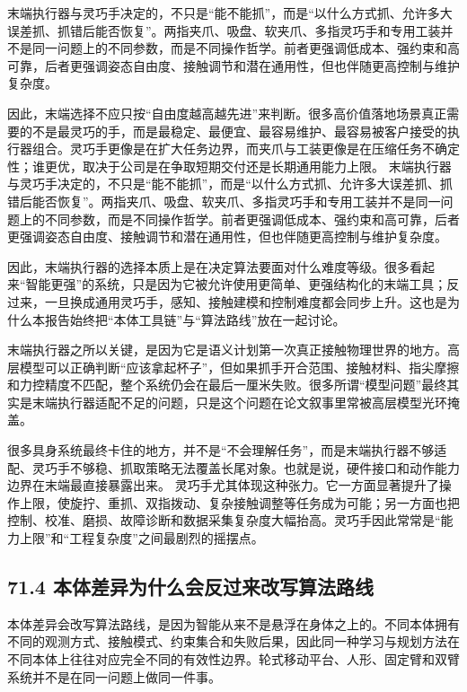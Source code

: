 末端执行器与灵巧手决定的，不只是“能不能抓”，而是“以什么方式抓、允许多大误差抓、抓错后能否恢复”。两指夹爪、吸盘、软夹爪、多指灵巧手和专用工装并不是同一问题上的不同参数，而是不同操作哲学。前者更强调低成本、强约束和高可靠，后者更强调姿态自由度、接触调节和潜在通用性，但也伴随更高控制与维护复杂度。

因此，末端选择不应只按“自由度越高越先进”来判断。很多高价值落地场景真正需要的不是最灵巧的手，而是最稳定、最便宜、最容易维护、最容易被客户接受的执行器组合。灵巧手更像是在扩大任务边界，而夹爪与工装更像是在压缩任务不确定性；谁更优，取决于公司是在争取短期交付还是长期通用能力上限。 末端执行器与灵巧手决定的，不只是“能不能抓”，而是“以什么方式抓、允许多大误差抓、抓错后能否恢复”。两指夹爪、吸盘、软夹爪、多指灵巧手和专用工装并不是同一问题上的不同参数，而是不同操作哲学。前者更强调低成本、强约束和高可靠，后者更强调姿态自由度、接触调节和潜在通用性，但也伴随更高控制与维护复杂度。

因此，末端执行器的选择本质上是在决定算法要面对什么难度等级。很多看起来“智能更强”的系统，只是因为它被允许使用更简单、更强结构化的末端工具；反过来，一旦换成通用灵巧手，感知、接触建模和控制难度都会同步上升。这也是为什么本报告始终把“本体工具链”与“算法路线”放在一起讨论。

末端执行器之所以关键，是因为它是语义计划第一次真正接触物理世界的地方。高层模型可以正确判断“应该拿起杯子”，但如果抓手开合范围、接触材料、指尖摩擦和力控精度不匹配，整个系统仍会在最后一厘米失败。很多所谓“模型问题”最终其实是末端执行器适配不足的问题，只是这个问题在论文叙事里常被高层模型光环掩盖。

很多具身系统最终卡住的地方，并不是“不会理解任务”，而是末端执行器不够适配、灵巧手不够稳、抓取策略无法覆盖长尾对象。也就是说，硬件接口和动作能力边界在末端最直接暴露出来。 灵巧手尤其体现这种张力。它一方面显著提升了操作上限，使旋拧、重抓、双指拨动、复杂接触调整等任务成为可能；另一方面也把控制、校准、磨损、故障诊断和数据采集复杂度大幅抬高。灵巧手因此常常是“能力上限”和“工程复杂度”之间最剧烈的摇摆点。

\subsection*{71.4 本体差异为什么会反过来改写算法路线}


本体差异会改写算法路线，是因为智能从来不是悬浮在身体之上的。不同本体拥有不同的观测方式、接触模式、约束集合和失败后果，因此同一种学习与规划方法在不同本体上往往对应完全不同的有效性边界。轮式移动平台、人形、固定臂和双臂系统并不是在同一问题上做同一件事。

